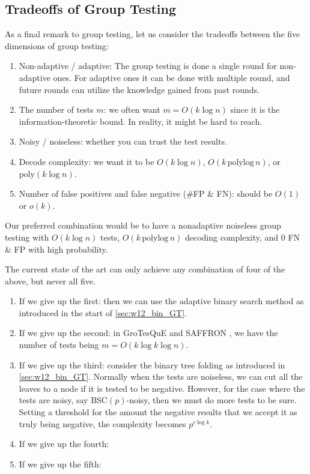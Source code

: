 \subsection{Tradeoffs of Group Testing}

As a final remark to group testing, let us consider the tradeoffs between the five dimensions of group testing:
\begin{enumerate}
    \item Non-adaptive / adaptive: The group testing is done a single round for non-adaptive ones. For adaptive ones it can be done with multiple round, and future rounds can utilize the knowledge gained from past rounds.
    \item The number of tests $m$: we often want $m=O(k\log n)$ since it is the information-theoretic bound. In reality, it might be hard to reach.
    \item Noisy / noiseless: whether you can trust the test results.
    \item Decode complexity: we want it to be $O(k\log n)$, $O(k\,\mathrm{polylog}\,n)$, or $\mathrm{poly}(k\log n)$.
    \item Number of false positives and false negative (\#FP \& FN): should be $O(1)$ or $o(k)$.
\end{enumerate}
Our preferred combination would be to have a nonadaptive noiseless group testing with $O(k\log n)$ tests, $O(k\,\mathrm{polylog}\,n)$ decoding complexity, and 0 FN \& FP with high probability.

The current state of the art can only achieve any combination of four of the above, but never all five.
\begin{enumerate}
    \item If we give up the first: then we can use the adaptive binary search method as introduced in the start of \autoref{sec:w12_bin_GT}.
    \item If we give up the second: in GroTesQuE \cite{grotesque_GT} and SAFFRON \cite{saffron_GT}, we have the number of tests being $m=O(k\log k\log n)$.
    \item If we give up the third: consider the binary tree folding as introduced in \autoref{sec:w12_bin_GT}. Normally when the tests are noiseless, we can cut all the leaves to a node if it is tested to be negative. However, for the case where the tests are noisy, say $\mathrm{BSC}(p)$-noisy, then we must do more tests to be sure. Setting a threshold for the amount the negative results that we accept it as truly being negative, {\color{red}the complexity becomes $p^{c\log k}$.}


    \item If we give up the fourth:


    \item If we give up the fifth:

    
\end{enumerate}

